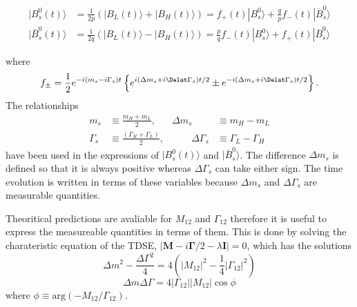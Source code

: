 {\begin{align}
| B^{0}_{s}(t) \rangle &= \frac{1}{2p}\left(|B_{L}(t)\rangle + |B_{H}(t) \rangle \right)  = f_{+}(t) |B^{0}_{s} \rangle + \frac{q}{p}f_{-}(t) |\overline{B}^{0}_{s}\rangle \\
| \overline{B}^{0}_{s}(t) \rangle &= \frac{1}{2q}\left(|B_{L}(t)\rangle - |B_{H}(t) \rangle \right)  = \frac{p}{q}f_{-}(t) |B^{0}_{s} \rangle+ f_{+}(t) |\overline{B}^{0}_{s}\rangle 
\end{align}

where 
\begin{equation}
f_{\pm} = \frac{1}{2} e^{-i(m_s - i\Gamma_s)t} \left \{ e^{i(\Delta m_s + i \Delat\Gamma_s)t/2} \pm e^{-i(\Delta m_s + i \Delat\Gamma_s)t/2} \right \}.
\end{equation}
The relationships
\begin{align}
m_s &\equiv \frac{m_H + m_L}{2}, &  \Delta m_s &\equiv m_H - m_L\\
\Gamma_s &\equiv \frac{(\Gamma_H + \Gamma_L)}{2}, & \qquad \Delta \Gamma_s &\equiv \Gamma_L - \Gamma_H
\label{eq:deltas}
\end{align}
have been used in the expressions of $|B^{0}_{s}(t)\rangle$ and $|\overline{B}^{0}_{s} \rangle$. The difference $\Delta m_s$ is defined so that it is always positive whereas $\Delta\Gamma_s$ can take either sign. The time evolution is written in terms of these variables because $\Delta m_s$ and $\Delta\Gamma_s$ are measurable quantities.

Theoritical predictions are avaliable for $M_{12}$ and $\Gamma_{12}$ therefore it is useful to express the measureable quantities in terms of them. This is done by solving the charateristic equation of the TDSE, $|\mathbf{M} - i \mathbf{\Gamma}/2 - \lambda \mathbf{I}| = 0$, which has the solutions
\begin{equation}
\Delta m^2 - \frac{\Delta\Gamma^2}{4} = 4(|M_{12}|^2 - \frac{1}{4} |\Gamma_{12}|^2) 
\end{equation}
\begin{equation}
\Delta m \Delta \Gamma = 4 |\Gamma_{12}| |M_{12}| \cos \phi
\end{equation}
where $\phi \equiv \mathrm{arg}(-M_{12}/\Gamma_{12})$.

}

